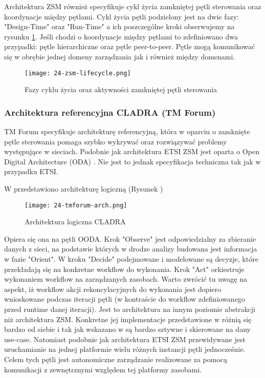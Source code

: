 Architektura ZSM również specyfikuje cykl życia zamkniętej pętli sterowania oraz koordynacje między pętlami. Cykl życia pętli podzielony jest na dwie fazy: "Design-Time" oraz "Run-Time" a ich poszczególne kroki obserwujemy na rysunku \ref{fig:24-zsm-lifecycle}. Jeśli chodzi o koordynacje między pętlami to zdefiniowano dwa przypadki: pętle hierarchiczne oraz pętle peer-to-peer. Pętle mogą komunikować się w obrębie jednej domeny zarządzania jak i również między domenami. 

\begin{figure}[!htbp]
    \centering \texttt{[image: 24-zsm-lifecycle.png]}
    \caption{Fazy cyklu życia oraz aktywności zamkniętej pętli sterowania}\label{fig:24-zsm-lifecycle}
\end{figure}




\subsubsection{Architektura referencyjna CLADRA (TM Forum)}\hypertarget{sec:cladra}{}

TM Forum specyfikuje architekturę referencyjną, która w oparciu o zamknięte pętle sterowania pomaga szybko wykrywać oraz rozwiązywać problemy występujące w sieciach. Podobnie jak architektura ETSI ZSM jest oparta o Open Digital Architecture (ODA) \cite{tmforum2018}. Nie jest to jednak specyfikacja techniczna tak jak w przypadku ETSI. 

W \cite{tmforum2021} przedstawiono architekturę logiczną (Rysunek )

\begin{figure}[!htbp]
    \centering \texttt{[image: 24-tmforum-arch.png]}
    \caption{Architektura logiczna CLADRA}\label{fig:24-tmforum-arch}
\end{figure}

Opiera się ona na pętli OODA. Krok "Observe" jest odpowiedzialny za zbieranie danych z sieci, na podstawie których w drodze analizy budowana jest informacja w fazie "Orient". W kroku "Decide" podejmowane i modelowane są decyzje, które przekładają się na konkretne workflow do wykonania. Krok "Act" orkiestruje wykonaniem workflow na zarządzanych zasobach. Warto zwrócić tu uwagę na aspekt, iż workflow akcji rekoncylacyjnych do wykonania jest dopiero wnioskowane podczas iteracji pętli (w kontraście do workflow zdefiniowanego przed runtime danej iteracji). Jest to architektura na innym poziomie abstrakcji niż architektura ZSM. Konkretne jej implementacje przedstawione w \cite{tmforum2022} różnią się bardzo od siebie i tak jak wskazano w \cite{fallon2019} są bardzo sztywne i skierowane na dany use-case. Natomiast podobnie jak architektura ETSI ZSM przewidywane jest uruchamianie na jednej platformie wielu różnych instancji pętli jednocześnie. Celem tych pętli jest autonomiczne zarządzanie realizowane za pomocą komunikacji z zewnętrznymi względem tej platformy zasobami. 

